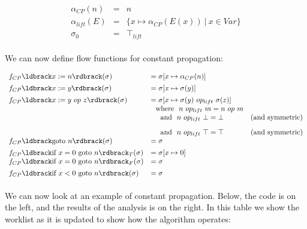 \documentclass[11pt]{article}
\begin{document}
\[
\begin{array}{ccl}

\alpha_{CP}(n) & = & n\\
\alpha_{lift}(E) & = & \{ x \mapsto \alpha_{CP}(E(x)) ~|~ x \in \textit{Var} \}\\
\sigma_0 & = & \top_{lift} \\

\end{array}
\]

We can now define flow functions for constant propagation:

\[
\begin{array}{lll}

f_{CP}\parg{x := n}(\sigma) & = \sigma[x \mapsto \alpha_{CP}(n)]\\[1ex]

f_{CP}\parg{x := y}(\sigma) & = \sigma[x \mapsto \sigma(y)]\\[1ex]

f_{CP}\parg{x := y ~op~ z}(\sigma) & = \sigma[x \mapsto \sigma(y) ~op_{lift}~ \sigma(z)]\\
 & ~~\mbox{where}~~ n ~op_{lift}~ m = n ~op~ m\\
 & ~~~~\mbox{and}~~ n ~op_{lift}~ \bottom = \bottom & \mbox{(and symmetric)}\\[2ex]
 & ~~~~\mbox{and}~~ n ~op_{lift}~ \top = \top & \mbox{(and symmetric)}\\
f_{CP}\parg{\mbox{goto}~n}(\sigma) & = \sigma\\[1ex]

f_{CP}\parg{\mbox{if}~x=0~\mbox{goto}~n}_T(\sigma) & = \sigma[x \mapsto 0]\\
f_{CP}\parg{\mbox{if}~x=0~\mbox{goto}~n}_F(\sigma) & = \sigma\\[1ex]
f_{CP}\parg{\mbox{if}~x<0~\mbox{goto}~n}(\sigma) & = \sigma\\[1ex]

\end{array}
\]


We can now look at an example of constant propagation.  Below, the code is on the left, and the results of the analysis is on the right. In this table we show the worklist as it is updated to show how the algorithm operates:  
\end{document}
